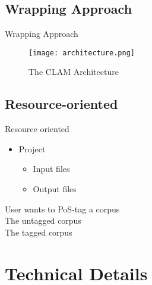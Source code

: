 \documentclass[compress]{beamer}
\begin{document}
\subsection{Wrapping Approach}
\begin{frame}

    \begin{block}{Wrapping Approach}

        \begin{figure}[h]
        \begin{center}
        \texttt{[image: architecture.png]}
        \end{center}
        \caption{The CLAM Architecture}
        \label{fig:arch} 
        \end{figure}


    \end{block}

\end{frame}



\subsection{Resource-oriented}
\begin{frame}

    \begin{block}{Resource oriented}
   
        \begin{itemize}
            \item Project
            \begin{itemize}
                \item Input files
                \item Output files
            \end{itemize}
        \end{itemize}

    \end{block}

    \begin{example}
         User wants to PoS-tag a corpus \\
         The untagged corpus \\
         The tagged corpus \\
    \end{example}

\end{frame}


\section{Technical Details}
\end{document}
